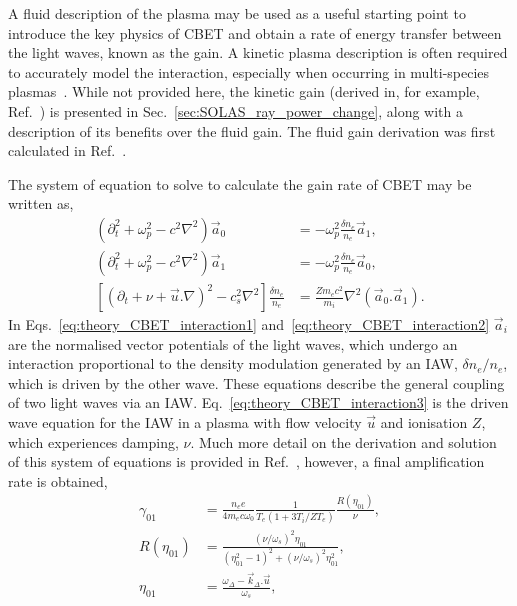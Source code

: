 A fluid description of the plasma may be used as a useful starting point to introduce the key physics of \ac{CBET} and obtain a rate of energy transfer between the light waves, known as the gain.
A kinetic plasma description is often required to accurately model the interaction, especially when occurring in multi-species plasmas~\cite{williams_frequency_1995}.
While not provided here, the kinetic gain (derived in, for example, Ref.~\cite{michel_saturation_2013}) is presented in Sec.~\ref{sec:SOLAS_ray_power_change}, along with a description of its benefits over the fluid gain.
The fluid gain derivation was first calculated in Ref.~\cite{randall_theory_1981}. 

The system of equation to solve to calculate the gain rate of \ac{CBET} may be written as,
\begin{align}
    \label{eq:theory_CBET_interaction1}
    (\partial_t^2 + \omega_p^2 - c^2\nabla^2)\vec{a}_0 &= -\omega_p^2\frac{\delta n_e}{n_{e}}\vec{a}_1,\\
    \label{eq:theory_CBET_interaction2}
    (\partial_t^2 + \omega_p^2 - c^2\nabla^2)\vec{a}_1 &= -\omega_p^2\frac{\delta n_e}{n_{e}}\vec{a}_0,\\
    \label{eq:theory_CBET_interaction3}
    \left[ \left( \partial_t + \nu + \vec{u}.\nabla \right)^2 - c_s^2\nabla^2 \right]\frac{\delta n_e}{n_{e}} &= \frac{Z m_e c^2}{m_i}\nabla^2 (\vec{a}_0 . \vec{a}_1).
\end{align}
In Eqs.~\ref{eq:theory_CBET_interaction1} and~\ref{eq:theory_CBET_interaction2} $\vec{a}_i$ are the normalised vector potentials of the light waves, which undergo an interaction proportional to the density modulation generated by an \ac{IAW}, $\delta n_e/n_{e}$, which is driven by the other wave.
These equations describe the general coupling of two light waves via an \ac{IAW}.
Eq.~\ref{eq:theory_CBET_interaction3} is the driven wave equation for the \ac{IAW} in a plasma with flow velocity $\vec{u}$ and ionisation $Z$, which experiences damping, $\nu$.
Much more detail on the derivation and solution of this system of equations is provided in Ref.~\cite{michel_introduction_2023}, however, a final amplification rate is obtained,
\begin{align}
    \label{eq:theory_CBET_linear_gain}
    \gamma_{01} &= \frac{n_e e}{4 m_e c \omega_0} \frac{1}{T_e \left( 1 + 3 T_i / Z T_e \right)} \frac{R(\eta_{01})}{\nu}, \\
    R(\eta_{01}) &= \frac{ (\nu/\omega_{s})^2 \eta_{01} } { (\eta_{01}^2 - 1)^2 + (\nu/\omega_s)^2 \eta_{01}^2 }, \\
    \label{eq:theory_resonace_param_fluid}
    \eta_{01} &= \frac{ \omega_\Delta - \vec{k}_\Delta.\vec{u} }{\omega_s},
\end{align}
